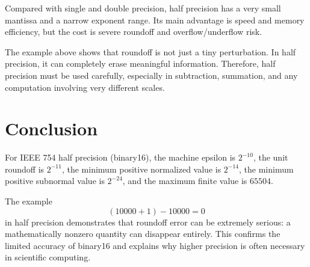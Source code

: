 \documentclass[12pt,a4paper]{article}
\begin{document}
Compared with single and double precision, half precision has a very small mantissa and a narrow exponent range. Its main advantage is speed and memory efficiency, but the cost is severe roundoff and overflow/underflow risk.

The example above shows that roundoff is not just a tiny perturbation. In half precision, it can completely erase meaningful information. Therefore, half precision must be used carefully, especially in subtraction, summation, and any computation involving very different scales.

\section{Conclusion}

For IEEE 754 half precision (binary16), the machine epsilon is $2^{-10}$, the unit roundoff is $2^{-11}$, the minimum positive normalized value is $2^{-14}$, the minimum positive subnormal value is $2^{-24}$, and the maximum finite value is $65504$.

The example
\[
    (10000+1)-10000=0
\]
in half precision demonstrates that roundoff error can be extremely serious: a mathematically nonzero quantity can disappear entirely. This confirms the limited accuracy of binary16 and explains why higher precision is often necessary in scientific computing.
\end{document}
